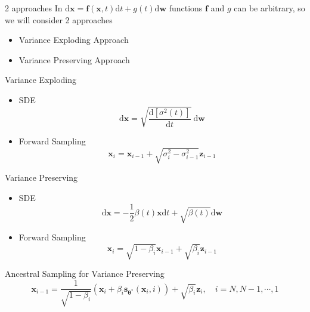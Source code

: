 \documentclass[xcolor=dvipsnames]{beamer}
\begin{document}
    \begin{frame}{2 approaches}
        In $\mathrm{d} \mathbf{x}=\mathbf{f}(\mathbf{x}, t) \mathrm{d} t+g(t) \mathrm{d} \mathbf{w}$ functions $\mathbf{f}$ and $g$ can be arbitrary, so we will consider 2 approaches
        \begin{itemize}
            \item Variance Exploding Approach
            \item Variance Preserving Approach
        \end{itemize}
    \end{frame}

    \begin{frame}{Variance Exploding}
        \begin{itemize}
            \item SDE 
        $$
        \mathrm{d} \mathbf{x}=\sqrt{\frac{\mathrm{d}\left[\sigma^2(t)\right]}{\mathrm{d} t}} \mathrm{~d} \mathbf{w}
        $$
            \item Forward Sampling
            $$
            \mathbf{x}_i=\mathbf{x}_{i-1}+\sqrt{\sigma_i^2-\sigma_{i-1}^2} \mathbf{z}_{i-1}
            $$
        \end{itemize}
    \end{frame}


    \begin{frame}{Variance Preserving}
        \begin{itemize}
        \item SDE 
            $$
        \mathrm{d} \mathbf{x}=-\frac{1}{2} \beta(t) \mathbf{x} \mathrm{d} t+\sqrt{\beta(t)} \mathrm{d} \mathbf{w}
        $$
        \item Forward Sampling
        $$
        \mathbf{x}_i=\sqrt{1-\beta_i} \mathbf{x}_{i-1}+\sqrt{\beta_i} \mathbf{z}_{i-1}
        $$
        \end{itemize}
    \end{frame}

    \begin{frame}{Ancestral Sampling for Variance Preserving}
        $$
        \mathbf{x}_{i-1}=\frac{1}{\sqrt{1-\beta_i}}\left(\mathbf{x}_i+\beta_i \mathbf{s}_{\boldsymbol{\theta}^*}\left(\mathbf{x}_i, i\right)\right)+\sqrt{\beta_i} \mathbf{z}_i, \quad i=N, N-1, \cdots, 1
        $$
    \end{frame}
\end{document}
